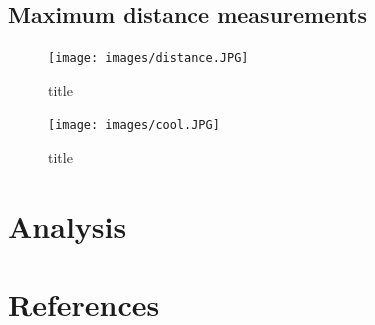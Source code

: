 \documentclass[12pt,a4paper]{article}
\begin{document}
	\subsection{Maximum distance measurements}
		\begin{figure}
			\texttt{[image: images/distance.JPG]}
			\caption{title}
			\label{distance}
		\end{figure}
		
		\begin{figure}
			\texttt{[image: images/cool.JPG]}
			\caption{title}
			\label{cool}
		\end{figure}




\section{Analysis}

\section{References}


\end{document}
